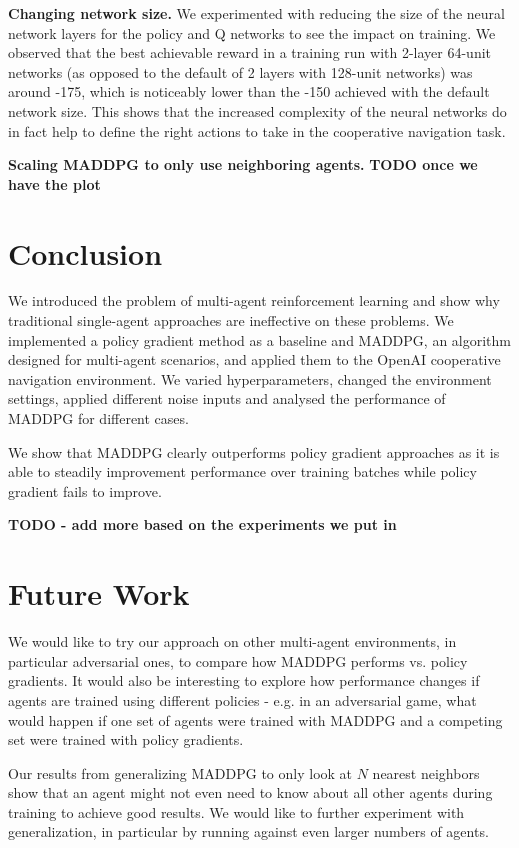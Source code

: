 \documentclass{article}
\begin{document}
\textbf{Changing network size.} We experimented with reducing the size of the neural network layers for the policy and Q networks to see the impact on training. We observed that the best achievable reward in a training run with 2-layer 64-unit networks (as opposed to the default of 2 layers with 128-unit networks) was around -175, which is noticeably lower than the -150 achieved with the default network size. This shows that the increased complexity of the neural networks do in fact help to define the right actions to take in the cooperative navigation task. 

\textbf{Scaling MADDPG to only use neighboring agents.} \textbf{TODO once we have the plot}

\section{Conclusion}

We introduced the problem of multi-agent reinforcement learning and show why traditional single-agent approaches are ineffective on these problems. We implemented a policy gradient method as a baseline and MADDPG, an algorithm designed for multi-agent scenarios, and applied them to the OpenAI cooperative navigation environment. We varied hyperparameters, changed the environment settings, applied different noise inputs and analysed the performance of MADDPG for different cases. 

We show that MADDPG clearly outperforms policy gradient approaches as it is able to steadily improvement performance over training batches while policy gradient fails to improve. 

\textbf{TODO - add more based on the experiments we put in} 


\section{Future Work}
We would like to try our approach on other multi-agent environments, in particular adversarial ones, to compare how MADDPG performs vs. policy gradients. It would also be interesting to explore how performance changes if agents are trained using different policies - e.g. in an adversarial game, what would happen if one set of agents were trained with MADDPG and a competing set were trained with policy gradients.

Our results from generalizing MADDPG to only look at $N$ nearest neighbors show that an agent might not even need to know about all other agents during training to achieve good results. We would like to further experiment with generalization, in particular by running against even larger numbers of agents.
\end{document}
